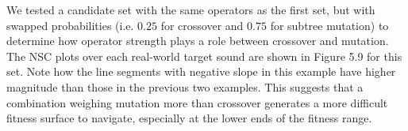 \documentclass[a4paper,12pt]{report} 	%
\numberwithin{figure}{chapter}
\numberwithin{table}{chapter}
\numberwithin{equation}{chapter}
\begin{document}
\begin{flushleft}
We tested a candidate set with the same operators as the first set, but with swapped probabilities (i.e. $0.25$ for crossover and $0.75$ for subtree mutation) to determine how operator strength plays a role between crossover and mutation. The NSC plots over each real-world target sound are shown in Figure 5.9 for this set.
Note how the line segments with negative slope in this example have higher magnitude than those in the previous two examples. This suggests that a combination weighing mutation more than crossover generates a more difficult fitness surface to navigate, especially at the lower ends of the fitness range.


\end{flushleft}
\end{document}
